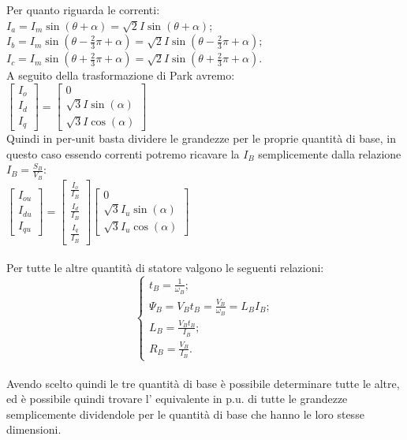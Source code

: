 \documentclass[Lau,noexaminfo]{sapthesis}
\begin{document}
	 Per quanto riguarda le correnti:\\
	 $I_a=I_m\sin(\theta+\alpha)=\sqrt{2}I\sin(\theta+\alpha)$;\\
	 $I_b=I_m\sin(\theta-\frac{2}{3}\pi+\alpha)=\sqrt{2}I\sin(\theta-\frac{2}{3}\pi+\alpha)$;\\
	 $I_c=I_m\sin(\theta+\frac{2}{3}\pi+\alpha)=\sqrt{2}I\sin(\theta+\frac{2}{3}\pi+\alpha)$.\\
	 A seguito della trasformazione di Park avremo:\\
	 $\begin{bmatrix}
	 I_o\\
	 I_d\\
	 I_q
	 \end{bmatrix}=
	 \begin{bmatrix}
	 0\\
	 \sqrt{3}I\sin(\alpha)\\
	 \sqrt{3}I\cos(\alpha)
	 \end{bmatrix}$\\
	 Quindi in per-unit basta dividere le grandezze per le proprie quantità di base, in questo caso essendo correnti potremo ricavare la $I_B$ semplicemente dalla relazione $I_B=\frac{S_B}{V_B}$:\\
	 $\begin{bmatrix}
	 I_{ou}\\
	 I_{du}\\
	 I_{qu}
	 \end{bmatrix}=
	 \begin{bmatrix}
	 \frac{I_{o}}{I_B}\\
	 \frac{I_{d}}{I_B}\\
	 \frac{I_{q}}{I_B}
	 \end{bmatrix}
	 \begin{bmatrix}
	 0\\
	 \sqrt{3}I_u\sin(\alpha)\\
	 \sqrt{3}I_u\cos(\alpha)
	 \end{bmatrix}$\\\\
	 Per tutte le altre quantità di statore valgono le seguenti relazioni:\\
	 \begin{equation}
	 \begin{cases}
	 t_B=\frac{1}{\omega_B};\\
	 \Psi_B=V_B t_B=\frac{V_B}{\omega_B}=L_B I_B;\\
	 L_B=\frac{V_B t_B}{I_B};\\
	 R_B=\frac{V_B}{I_B}.
	 \end{cases}
	 \end{equation}\\
	 Avendo scelto quindi le tre quantità di base è possibile determinare tutte le altre, ed è possibile quindi trovare l' equivalente in p.u. di tutte le grandezze semplicemente dividendole per le quantità di base che hanno le loro stesse dimensioni.
\end{document}
